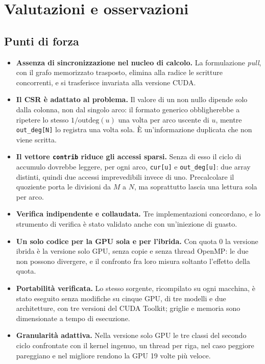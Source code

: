 \documentclass[11pt,a4paper]{article}
\begin{document}
\section{Valutazioni e osservazioni}

\subsection{Punti di forza}
\begin{itemize}
  \item \textbf{Assenza di sincronizzazione nel nucleo di calcolo.} La
    formulazione \emph{pull}, con il grafo memorizzato trasposto, elimina
    alla radice le scritture concorrenti, e si trasferisce invariata alla
    versione CUDA.
  \item \textbf{Il CSR è adattato al problema.} Il valore di un non nullo
    dipende solo dalla colonna, non dal singolo arco: il formato generico
    obbligherebbe a ripetere lo stesso $1/\mathrm{outdeg}(u)$ una volta per
    arco uscente di $u$, mentre \texttt{out\_deg[N]} lo registra una volta
    sola. È un'informazione duplicata che non viene
    scritta.
  \item \textbf{Il vettore \texttt{contrib} riduce gli accessi sparsi.} Senza
    di esso il ciclo di accumulo dovrebbe leggere, per ogni arco,
    \texttt{cur[u]} e \texttt{out\_deg[u]}: due array distinti, quindi due
    accessi imprevedibili invece di uno. Precalcolare il quoziente porta le
    divisioni da $M$ a $N$, ma soprattutto lascia una lettura sola per arco.
  \item \textbf{Verifica indipendente e collaudata.} Tre implementazioni
    concordano, e lo strumento di verifica è
    stato validato anche con un'iniezione di guasto.
  \item \textbf{Un solo codice per la GPU sola e per l'ibrida.} Con
    quota 0 la versione ibrida è la versione solo GPU, senza copie e senza
    thread OpenMP: le due non possono divergere, e il confronto fra loro misura
    soltanto l'effetto della quota.
  \item \textbf{Portabilità verificata.} Lo stesso sorgente, ricompilato
    su ogni macchina, è stato eseguito senza modifiche su cinque
    GPU, di tre modelli e due architetture, con tre versioni del CUDA Toolkit;
    griglie e memoria sono dimensionate a tempo di esecuzione.
  \item \textbf{Granularità adattiva.} Nella versione solo GPU
    le tre classi del secondo ciclo confrontate con il kernel ingenuo, un
    thread per riga, nel caso peggiore pareggiano
    e nel migliore rendono la GPU 19 volte più veloce.
\end{itemize}
\end{document}
